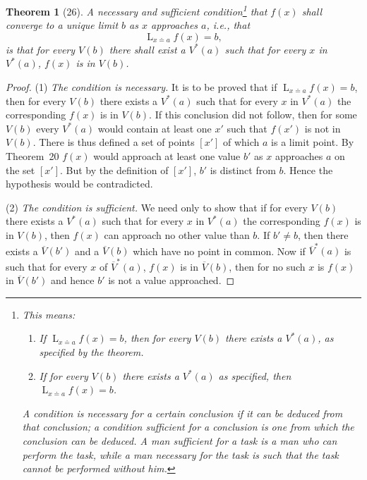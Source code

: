 \documentclass[a4paper,12pt]{book}[2004/02/16]
\providecommand{\hyperlink}[2]{#2}
\providecommand{\hypertarget}[2]{#2}
\theoremstyle{ilemma}
\theoremstyle{itheorem}
\newtheorem{theorem}{Theorem}
\theoremstyle{iother}
\theoremstyle{icorollary}
\theoremstyle{numcorollary}
\theoremstyle{idefinition}
\begin{document}
\begin{theorem}[26]\hypertarget{thm26}{}
A necessary and sufficient condition\footnote{%
    This means:
    \begin{enumerate}
    \item[(\textit{a})] If $\displaystyle\mathop{L}_{x \doteq a} f(x) = b$, then for
      every $V(b)$ there exists a $V^*(a)$, as specified by the theorem.
    \item[(\textit{b})] If for every $V(b)$ there exists a $V^*(a)$ as specified,
      then $\displaystyle\mathop{L}_{x \doteq a} f(x) = b$.
    \end{enumerate}

    A condition is necessary for a certain conclusion if it can be deduced
    from that conclusion; a condition sufficient for a conclusion is one
    from which the conclusion can be deduced. A man sufficient for a task
    is a man who can perform the task, while a man necessary for the task
    is such that the task cannot be performed without him.}
that $f(x)$ shall converge to a unique limit $b$ as $x$ approaches
$a$, i.e., that
\[
  \mathop{L}_{x \doteq a} f(x) = b,
\]
is that for every $V(b)$ there shall exist a $V^*(a)$ such that for
every $x$ in $V^*(a)$, $f(x)$ is in $V(b)$.
\end{theorem}

\begin{proof}
(1) \textit{The condition is necessary.} It is to be proved that if
$\displaystyle\mathop{L}_{x \doteq a} f(x) = b$, then for every $V(b)$ there exists
a $V^*(a)$ such that for every $x$ in $V^*(a)$ the corresponding
$f(x)$ is in $V(b)$. If this conclusion did not follow, then for some
$V(b)$ every $V^*(a)$ would contain at least one $x'$ such that
$f(x')$ is not in $V(b)$.  There is thus defined a set of points
$[x']$ of which $a$ is a limit point. By Theorem~\hyperlink{thm20}{20} $f(x)$ would
approach at least one value $b'$ as $x$ approaches $a$ on the set
$[x']$. But by the definition of $[x']$, $b'$ is distinct from
$b$. Hence the hypothesis would be contradicted.

(2) \textit{The condition is sufficient.} We need only to show that if
for every $V(b)$ there exists a $V^*(a)$ such that for every $x$ in
$V^*(a)$ the corresponding $f(x)$ is in $V(b)$, then $f(x)$ can
approach no other value than $b$. If $b' \ne b$, then there exists a
$\overline V(b')$ and a $\overline V(b)$ which have no point in
common. Now if $\overline V^*(a)$ is such that for every $x$ of
$\overline V^*(a)$, $f(x)$ is in $\overline V(b)$, then
for no such $x$ is $f(x)$ in $\overline{V}(b')$ and hence $b'$ is not
a value approached.
\end{proof}
\end{document}
